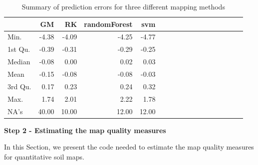 \documentclass[10pt,b5paper,]{book}
\theoremstyle{definition}
\theoremstyle{definition}
\theoremstyle{definition}
\theoremstyle{remark}
\begin{document}
\begin{table}

\caption{\label{tab:prederrors}Summary of prediction errors for three different mapping methods}
\centering
\begin{tabular}[t]{lrrrrrrrrrrrrrrrr}
\toprule
  & GM & RK & randomForest & svm\\
\midrule
Min. & -4.38 & -4.09 & -4.25 & -4.77\\
1st Qu. & -0.39 & -0.31 & -0.29 & -0.25\\
Median & -0.08 & 0.00 & 0.02 & 0.03\\
Mean & -0.15 & -0.08 & -0.08 & -0.03\\
3rd Qu. & 0.17 & 0.23 & 0.24 & 0.32\\
\addlinespace
Max. & 1.74 & 2.01 & 2.22 & 1.78\\
NA's & 40.00 & 10.00 & 12.00 & 12.00\\
\bottomrule
\end{tabular}
\end{table}

\textbf{Step 2 - Estimating the map quality measures}

In this Section, we present the code needed to estimate the map quality
measures for quantitative soil maps.
\end{document}
